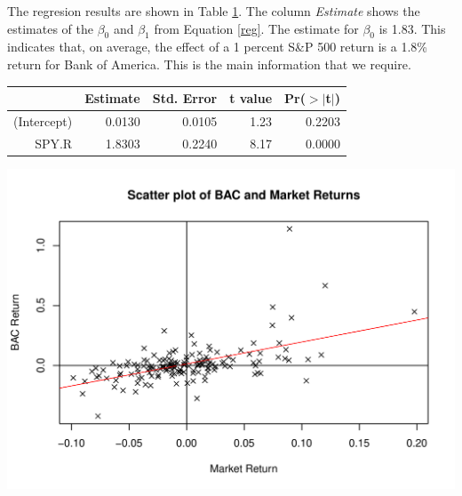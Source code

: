 \documentclass{article}\usepackage[]{graphicx}\usepackage[]{color}
\makeatletter
\def\maxwidth{ %
  \ifdim\Gin@nat@width>\linewidth
    \linewidth
  \else
    \Gin@nat@width
  \fi
}
\newenvironment{knitrout}{}{} %
\makeatother
\begin{document}
The regresion results are shown in Table \ref{tabref:reg}.  The column \emph{Estimate} shows the estimates of the $\beta_0$ and $\beta_1$ from Equation \ref{reg}.  The estimate for $\beta_0$ is 1.83.  This indicates that, on average, the effect of a 1 percent S\&P 500 return is a 1.8\% return for Bank of America. This is the main information that we require. 
\begin{table}[ht]\label{tabref:reg}
\centering
\begin{tabular}{rrrrr}
  \hline
 & Estimate & Std. Error & t value & Pr($>$$|$t$|$) \\ 
  \hline
(Intercept) & 0.0130 & 0.0105 & 1.23 & 0.2203 \\ 
  SPY.R & 1.8303 & 0.2240 & 8.17 & 0.0000 \\ 
   \hline
\end{tabular}
\end{table}
\begin{knitrout}
\color{fgcolor}

{\centering \includegraphics[width=\maxwidth]{figure/Reg2} 

}



\end{knitrout}
\end{document}
